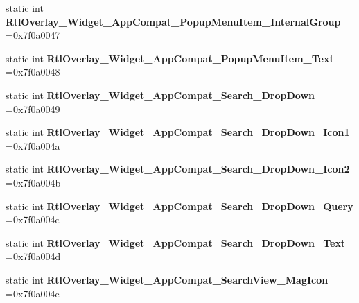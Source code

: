 \begin{DoxyCompactItemize}
static int {\bfseries Rtl\+Overlay\+\_\+\+Widget\+\_\+\+App\+Compat\+\_\+\+Popup\+Menu\+Item\+\_\+\+Internal\+Group} =0x7f0a0047
\item 
\mbox{\label{classandroid_1_1support_1_1v4_1_1R_1_1style_af0865589934709f0e4a062884dfddaf5}} 
static int {\bfseries Rtl\+Overlay\+\_\+\+Widget\+\_\+\+App\+Compat\+\_\+\+Popup\+Menu\+Item\+\_\+\+Text} =0x7f0a0048
\item 
\mbox{\label{classandroid_1_1support_1_1v4_1_1R_1_1style_a98fc260b2ec66ee4349afb83849f5b28}} 
static int {\bfseries Rtl\+Overlay\+\_\+\+Widget\+\_\+\+App\+Compat\+\_\+\+Search\+\_\+\+Drop\+Down} =0x7f0a0049
\item 
\mbox{\label{classandroid_1_1support_1_1v4_1_1R_1_1style_a74a7d05bad84c9dab1c950b8da0e1561}} 
static int {\bfseries Rtl\+Overlay\+\_\+\+Widget\+\_\+\+App\+Compat\+\_\+\+Search\+\_\+\+Drop\+Down\+\_\+\+Icon1} =0x7f0a004a
\item 
\mbox{\label{classandroid_1_1support_1_1v4_1_1R_1_1style_ad064d9bfbcecaf3160baedc0ab51a94a}} 
static int {\bfseries Rtl\+Overlay\+\_\+\+Widget\+\_\+\+App\+Compat\+\_\+\+Search\+\_\+\+Drop\+Down\+\_\+\+Icon2} =0x7f0a004b
\item 
\mbox{\label{classandroid_1_1support_1_1v4_1_1R_1_1style_a3c6fd5705bb97590bee6ad9060d5a6c1}} 
static int {\bfseries Rtl\+Overlay\+\_\+\+Widget\+\_\+\+App\+Compat\+\_\+\+Search\+\_\+\+Drop\+Down\+\_\+\+Query} =0x7f0a004c
\item 
\mbox{\label{classandroid_1_1support_1_1v4_1_1R_1_1style_a0a4bca3f43c4837c3535706bf123b5cc}} 
static int {\bfseries Rtl\+Overlay\+\_\+\+Widget\+\_\+\+App\+Compat\+\_\+\+Search\+\_\+\+Drop\+Down\+\_\+\+Text} =0x7f0a004d
\item 
\mbox{\label{classandroid_1_1support_1_1v4_1_1R_1_1style_a7ac80ea1baca2e4fa27b3497d318548e}} 
static int {\bfseries Rtl\+Overlay\+\_\+\+Widget\+\_\+\+App\+Compat\+\_\+\+Search\+View\+\_\+\+Mag\+Icon} =0x7f0a004e

\end{DoxyCompactItemize}

